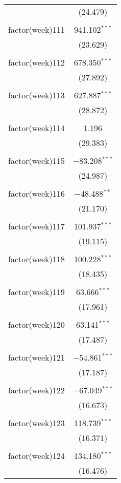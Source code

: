 \documentclass[twoside,twocolumn]{article}
\begin{document}
\begin{table}[!htbp]
\begin{tabular}{@{\extracolsep{5pt}}lc}
  & (24.479) \\ 
  & \\ 
 factor(week)111 & 941.102$^{***}$ \\ 
  & (23.629) \\ 
  & \\ 
 factor(week)112 & 678.350$^{***}$ \\ 
  & (27.892) \\ 
  & \\ 
 factor(week)113 & 627.887$^{***}$ \\ 
  & (28.872) \\ 
  & \\ 
 factor(week)114 & 1.196 \\ 
  & (29.383) \\ 
  & \\ 
 factor(week)115 & $-$83.208$^{***}$ \\ 
  & (24.987) \\ 
  & \\ 
 factor(week)116 & $-$48.488$^{**}$ \\ 
  & (21.170) \\ 
  & \\ 
 factor(week)117 & 101.937$^{***}$ \\ 
  & (19.115) \\ 
  & \\ 
 factor(week)118 & 100.228$^{***}$ \\ 
  & (18.435) \\ 
  & \\ 
 factor(week)119 & 63.666$^{***}$ \\ 
  & (17.961) \\ 
  & \\ 
 factor(week)120 & 63.141$^{***}$ \\ 
  & (17.487) \\ 
  & \\ 
 factor(week)121 & $-$54.861$^{***}$ \\ 
  & (17.187) \\ 
  & \\ 
 factor(week)122 & $-$67.049$^{***}$ \\ 
  & (16.673) \\ 
  & \\ 
 factor(week)123 & 118.739$^{***}$ \\ 
  & (16.371) \\ 
  & \\ 
 factor(week)124 & 134.180$^{***}$ \\ 
  & (16.476) \\ 

\end{tabular}
\end{table}
\end{document}
